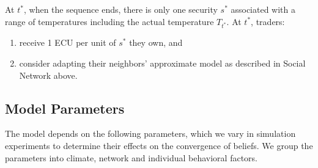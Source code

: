 \documentclass{wscpaperproc}\usepackage[]{graphicx}\usepackage[]{color}
\begin{document}
At $t^*$, when the sequence ends, there is only one security $s^*$ associated with a range of temperatures including the actual temperature $T_{t^*}$. 
At $t^*$, traders:

\begin{enumerate}
  \item  receive 1 ECU per unit of $s^*$ they own, and
  \item consider adapting their neighbors' approximate model as described in Social Network above.
\end{enumerate}

\subsection{Model Parameters}
  
The model depends on the following parameters, which we vary in simulation experiments to determine their effects on the convergence of beliefs. We group the parameters into climate, network and individual behavioral factors.
\end{document}
